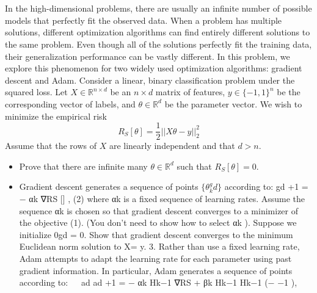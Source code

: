 \documentclass[a4paper]{article}
\begin{document}
\section{}
In the high-dimensional problems, there are usually an infinite number of possible models that perfectly fit the observed data.
When a problem has multiple solutions, different optimization algorithms can find entirely different solutions to the same problem.
Even though all of the solutions perfectly fit the training data, their generalization performance can be vastly different.
In this problem, we explore this phenomenon for two widely used optimization algorithms: gradient descent and Adam.
Consider a linear, binary classification problem under the squared loss.
Let $X \in \mathbb{R}^{n\times d}$ be an $n \times d$ matrix of features, $y \in \{-1, 1\}^n$ be the corresponding vector of labels, and $\theta \in \mathbb{R}^d$ be the parameter vector.
We wish to minimize the empirical risk
$$R_S[\theta] = \frac{1}{2} ||X\theta-y||^2_2$$
Assume that the rows of $X$ are linearly independent and that $d > n$.
\begin{itemize}
    \item Prove that there are infinite many $\theta \in \mathbb{R}^d$ such that $R_S [\theta] = 0.$
    \item Gradient descent generates a sequence of points $\{\theta_k^gd\}$ according to:
gd
\thetak+1
= \thetakgd − αk ∇RS [\thetakgd ] ,
(2)
where αk is a fixed sequence of learning rates. Assume the sequence αk is chosen so that gradient
descent converges to a minimizer of the objective (1). (You don’t need to show how to select αk ).
Suppose we initialize \theta0gd = 0. Show that gradient descent converges to the minimum Euclidean norm
solution to X\theta = y.
3. Rather than use a fixed learning rate, Adam attempts to adapt the learning rate foreach parameter
using past gradient information. In particular, Adam generates a sequence of points \thetakad according
to:
 
ad
ad
\thetak+1
= \thetakad − αk Hk−1 ∇RS \thetakad + βk Hk−1 Hk−1 (\thetakad − \thetak−1
),
\end{itemize}
\end{document}
